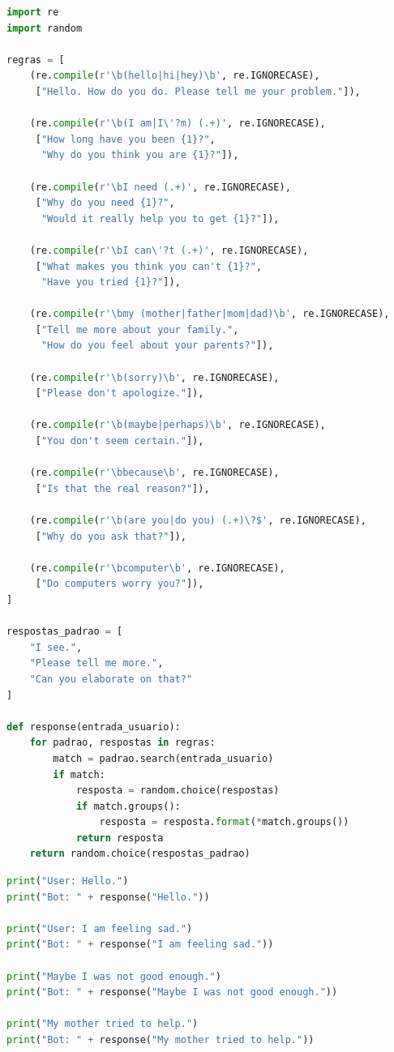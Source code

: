 \documentclass[14pt,a4paper,oneside]{book}
\begin{document}
\begin{lstlisting}[language=Python, caption=Chatbot Eliza em Python]
import re  
import random  

regras = [
    (re.compile(r'\b(hello|hi|hey)\b', re.IGNORECASE),
     ["Hello. How do you do. Please tell me your problem."]),

    (re.compile(r'\b(I am|I\'?m) (.+)', re.IGNORECASE),
     ["How long have you been {1}?",   
      "Why do you think you are {1}?"]),

    (re.compile(r'\bI need (.+)', re.IGNORECASE),
     ["Why do you need {1}?",
      "Would it really help you to get {1}?"]),

    (re.compile(r'\bI can\'?t (.+)', re.IGNORECASE),
     ["What makes you think you can't {1}?",
      "Have you tried {1}?"]),

    (re.compile(r'\bmy (mother|father|mom|dad)\b', re.IGNORECASE),
     ["Tell me more about your family.",
      "How do you feel about your parents?"]),

    (re.compile(r'\b(sorry)\b', re.IGNORECASE),
     ["Please don't apologize."]),

    (re.compile(r'\b(maybe|perhaps)\b', re.IGNORECASE),
     ["You don't seem certain."]),

    (re.compile(r'\bbecause\b', re.IGNORECASE),
     ["Is that the real reason?"]),

    (re.compile(r'\b(are you|do you) (.+)\?$', re.IGNORECASE),
     ["Why do you ask that?"]),

    (re.compile(r'\bcomputer\b', re.IGNORECASE),
     ["Do computers worry you?"]),
]

respostas_padrao = [
    "I see.",  
    "Please tell me more.",  
    "Can you elaborate on that?"  
]

def response(entrada_usuario):
    for padrao, respostas in regras:
        match = padrao.search(entrada_usuario)  
        if match:
            resposta = random.choice(respostas)
            if match.groups():
                resposta = resposta.format(*match.groups())
            return resposta
    return random.choice(respostas_padrao)
\end{lstlisting}

\begin{lstlisting}[language=Python, caption=Exemplo de uso do chatbot ELIZA]
print("User: Hello.")
print("Bot: " + response("Hello."))

print("User: I am feeling sad.")
print("Bot: " + response("I am feeling sad."))

print("Maybe I was not good enough.")
print("Bot: " + response("Maybe I was not good enough."))

print("My mother tried to help.")
print("Bot: " + response("My mother tried to help."))
\end{lstlisting}
\end{document}
